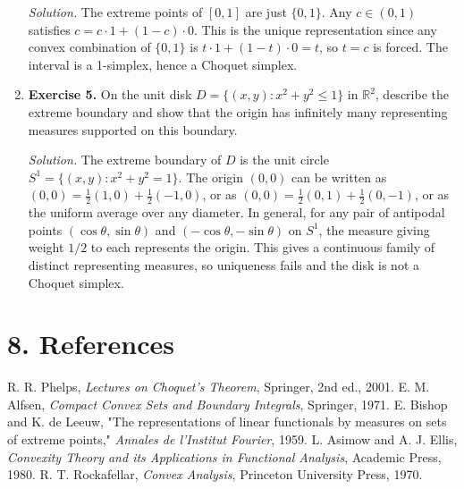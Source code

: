 \begin{enumerate}[leftmargin=*,itemsep=0.9em]
\emph{Solution.} The extreme points of $[0,1]$ are just $\{0,1\}$. Any $c\in(0,1)$ satisfies $c=c\cdot 1+(1-c)\cdot 0$. This is the unique representation since any convex combination of $\{0,1\}$ is $t\cdot 1+(1-t)\cdot 0=t$, so $t=c$ is forced. The interval is a 1-simplex, hence a Choquet simplex.

\item \textbf{Exercise 5.} On the unit disk $D=\{(x,y):x^2+y^2\le 1\}$ in $\mathbb{R}^2$, describe the extreme boundary and show that the origin has infinitely many representing measures supported on this boundary.

\emph{Solution.} The extreme boundary of $D$ is the unit circle $S^1=\{(x,y):x^2+y^2=1\}$. The origin $(0,0)$ can be written as $(0,0)=\frac{1}{2}(1,0)+\frac{1}{2}(-1,0)$, or as $(0,0)=\frac{1}{2}(0,1)+\frac{1}{2}(0,-1)$, or as the uniform average over any diameter. In general, for any pair of antipodal points $(\cos\theta,\sin\theta)$ and $(-\cos\theta,-\sin\theta)$ on $S^1$, the measure giving weight $1/2$ to each represents the origin. This gives a continuous family of distinct representing measures, so uniqueness fails and the disk is not a Choquet simplex.

\end{enumerate}
\section*{8. References}


\begin{thebibliography}{9}
 R. R. Phelps, \emph{Lectures on Choquet's Theorem}, Springer, 2nd ed., 2001.
 E. M. Alfsen, \emph{Compact Convex Sets and Boundary Integrals}, Springer, 1971.
 E. Bishop and K. de Leeuw, "The representations of linear functionals by measures on sets of extreme points," \emph{Annales de l'Institut Fourier}, 1959.
 L. Asimow and A. J. Ellis, \emph{Convexity Theory and its Applications in Functional Analysis}, Academic Press, 1980.
 R. T. Rockafellar, \emph{Convex Analysis}, Princeton University Press, 1970.
\end{thebibliography}
